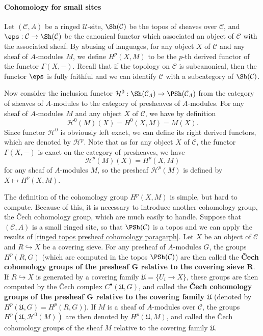 \paragraph{Cohomology for small sites}\label{ringed small site cohomology paragraph}
Let $(\mathcal{C},A)$ be a ringed $\mathscr{U}$-site, $\Sh(\mathcal{C})$ be the topos of sheaves over $\mathcal{C}$, and $\eps:\mathcal{C}\to \Sh(\mathcal{C})$ be the canonical functor which associated an object of $\mathcal{C}$ with the associated sheaf. By abusing of languages, for any object $X$ of $\mathcal{C}$ and any sheaf of $A$-modules $M$, we define $H^p(X,M)$ to be the $p$-th derived functor of the functor $\Gamma(X,-)$. Recall that if the topology on $\mathcal{C}$ is subcanonical, then the functor $\eps$ is fully faithful and we can identify $\mathcal{C}$ with a subcategory of $\Sh(\mathcal{C})$.\par
Now consider the inclusion functor $\mathcal{H}^0:\Sh(\mathcal{C}_A)\to \PSh(\mathcal{C}_A)$ from the category of sheaves of $A$-modules to the category of presheaves of $A$-modules. For any sheaf of $A$-modules $M$ and any object $X$ of $\mathcal{C}$, we have by definition
\[\mathcal{H}^0(M)(X)=H^0(X,M)=M(X).\]
Since functor $\mathcal{H}^0$ is obviously left exact, we can define its right derived functors, which are denoted by $\mathcal{H}^p$. Note that as for any object $X$ of $\mathcal{C}$, the functor $\Gamma(X,-)$ is exact on the category of presheaves, we have
\begin{equation}\label{ringed small site sheaf cohomology sheaf section char}
\mathcal{H}^p(M)(X)=H^p(X,M)
\end{equation}
for any sheaf of $A$-modules $M$, so the presheaf $\mathcal{H}^p(M)$ is defined by $X\mapsto H^p(X,M)$.\par
The definition of the cohomology group $H^p(X,M)$ is simple, but hard to compute. Because of this, it is necessary to introduce another cohomology group, the \v{C}ech cohomology group, which are much easily to handle. Suppose that $(\mathcal{C},A)$ is a small ringed site, so that $\PSh(\mathcal{C})$ is a topos and we can apply the results of \ref{ringed topos presheaf cohomology paragarph}. Let $X$ be an object of $\mathcal{C}$ and $R\hookrightarrow X$ be a covering sieve. For any presheaf of $A$-modules $G$, the groups $H^p(R,G)$ (which are computed in the topos $\PSh(\mathcal{C})$) are then called the \textbf{\v{C}ech cohomology groups of the presheaf $\bm{G}$ relative to the covering sieve $\bm{R}$}. If $R\hookrightarrow X$ is generated by a covering family $\mathfrak{U}=\{U_i\to X\}$, these groups are then computed by the \v{C}ech complex $C^\bullet(\mathfrak{U},G)$, and called the \textbf{\v{C}ech cohomology groups of the presheaf $\bm{G}$ relative to the covering family $\mathfrak{U}$} (denoted by $H^p(\mathfrak{U},G)=H^p(R,G)$). If $M$ is a sheaf of $A$-modules over $\mathcal{C}$, the groups $H^p(\mathfrak{U},\mathcal{H}^0(M))$ are then denoted by $H^p(\mathfrak{U},M)$, and called the \v{C}ech cohomology groups of the sheaf $M$ relative to the covering family $\mathfrak{U}$.\par
